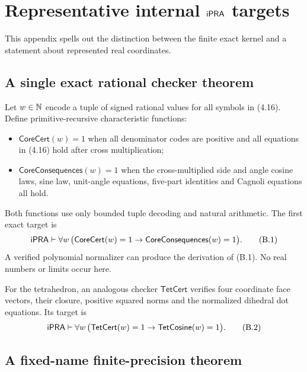 \section{Representative internal \(\mathsf{iPRA}\) targets}
\label{app:ipra-target}

This appendix spells out the distinction between the finite exact kernel and a
statement about represented real coordinates.

\subsection{A single exact rational checker theorem}

Let \(w\in\mathbb N\) encode a tuple of signed rational values for all symbols in
(4.16).  Define primitive-recursive characteristic functions:
\begin{itemize}
\item \(\mathsf{CoreCert}(w)=1\) when all denominator codes are positive and
all equations in (4.16) hold after cross multiplication;
\item \(\mathsf{CoreConsequences}(w)=1\) when the cross-multiplied side and
angle cosine laws, sine law, unit-angle equations, five-part identities and
Cagnoli equations all hold.
\end{itemize}
Both functions use only bounded tuple decoding and natural arithmetic.  The
first exact target is
\begin{equation}
 \mathsf{iPRA}\vdash
 \forall w\,
 \bigl(\mathsf{CoreCert}(w)=1\to
       \mathsf{CoreConsequences}(w)=1\bigr).                \tag{B.1}
\end{equation}
A verified polynomial normalizer can produce the derivation of (B.1).  No real
numbers or limits occur here.

For the tetrahedron, an analogous checker
\(\mathsf{TetCert}\) verifies four coordinate face vectors, their closure,
positive squared norms and the normalized dihedral dot equations.  Its target
is
\begin{equation}
 \mathsf{iPRA}\vdash
 \forall w\,
 \bigl(\mathsf{TetCert}(w)=1\to
       \mathsf{TetCosine}(w)=1\bigr).                       \tag{B.2}
\end{equation}

\subsection{A fixed-name finite-precision theorem}


